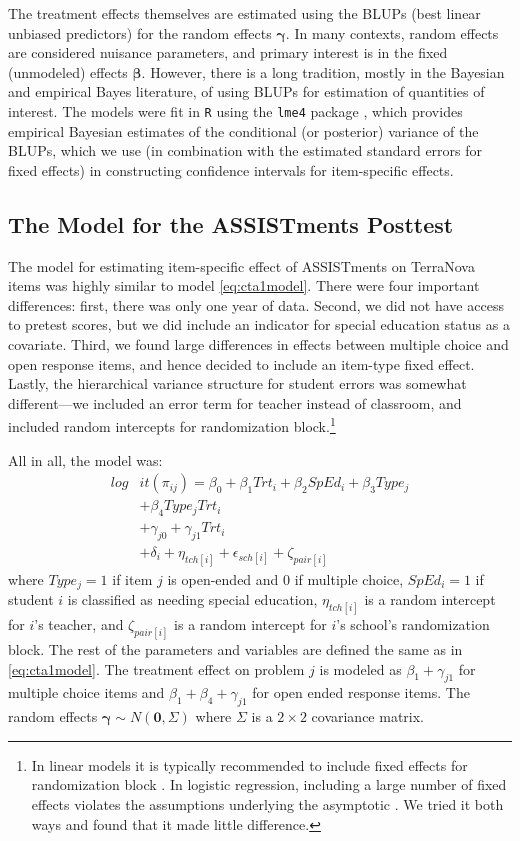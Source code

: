 \documentclass{edm_article}
\begin{document}
The treatment effects themselves are estimated using the BLUPs (best
linear unbiased predictors) for the random effects $\bm{\gamma}$.
In many contexts, random effects are considered nuisance parameters,
and primary interest is in the fixed (unmodeled) effects
$\bm{\beta}$.
However, there is a long tradition, mostly in the Bayesian and
empirical Bayes literature, of using BLUPs for estimation of
quantities of interest.
The models were fit in \texttt{R} \cite{rcite} using the \texttt{lme4}
package \cite{lme4}, which provides empirical Bayesian estimates of
the conditional (or posterior) variance of the BLUPs, which we use (in
combination with the estimated standard errors for fixed effects) in
constructing confidence intervals for item-specific effects. 

\subsection{The Model for the ASSISTments Posttest}
The model for estimating item-specific effect of ASSISTments on
TerraNova items was highly similar to model \eqref{eq:cta1model}.
There were four important differences: first, there was only one year
of data. Second, we did not have access to pretest scores, but we did
include an indicator for special education status as a
covariate. Third, we found large differences in effects between
multiple choice and open response items, and hence decided to include
an item-type fixed effect. Lastly, the hierarchical variance structure
for student errors was somewhat different---we included an error term
for teacher instead of classroom, and included random intercepts for
randomization block.\footnote{In linear models it is typically
  recommended to include fixed effects for randomization block
  \cite{bloom}. In logistic regression, including a large number of
  fixed effects violates the assumptions underlying the asymptotic
  \cite{agresti}. We tried it both ways and found that it made little
  difference.}

All in all, the model was:
\begin{equation}\label{eq:assmodel}
  \begin{split}
    log&it(\pi_{ij})=\beta_0+\beta_1Trt_i+\beta_2SpEd_i+\beta_3Type_j\\
    &+\beta_4Type_jTrt_i\\
  &+\gamma_{j0}+\gamma_{j1}Trt_i\\
  &+\delta_{i}+\eta_{tch[i]}+\epsilon_{sch[i]}+\zeta_{pair[i]}
\end{split}
\end{equation}
where $Type_j=1$ if item $j$ is open-ended and 0 if multiple choice,
$SpEd_i=1$ if student $i$ is classified as needing special education,
$\eta_{tch[i]}$ is a random intercept for $i$'s teacher, and
$\zeta_{pair[i]}$ is a random intercept for $i$'s school's
randomization block.
The rest of the parameters and variables are defined the same as in
\eqref{eq:cta1model}.
The treatment effect on problem $j$ is modeled as
$\beta_1+\gamma_{j1}$ for multiple choice items and
$\beta_1+\beta_4+\gamma_{j1}$ for open ended response items.
The random effects $\bm{\gamma}\sim N(\bm{0},\Sigma)$ where $\Sigma$
is a $2\times 2$ covariance matrix. 
\end{document}
